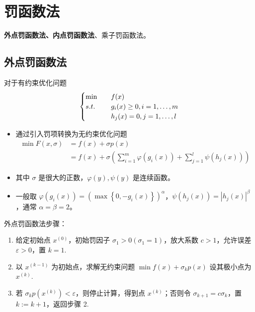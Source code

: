 \section{罚函数法}
\textbf{外点罚函数法、内点罚函数法}、乘子罚函数法。

\subsection{外点罚函数法}
\begin{note}
    对于有约束优化问题 
    \[
        \begin{cases}
            \min \quad &f(x)\\
            s.t. \quad &g_i(x) \ge 0, i = 1, \dots, m\\
            &h_j(x) = 0, j = 1, \dots, l
        \end{cases}
    \]
    \begin{itemize}
        \item 通过引入罚项转换为无约束优化问题 
        \begin{align*}
            \min F(x, \sigma) &= f(x) + \sigma p(x)\\
            &= f(x) + \sigma \left(\sum_{i = 1}^m \varphi(g_i(x)) + \sum_{j = 1}^l \psi(h_j(x))\right)
        \end{align*}
        \item 其中 $\sigma$ 是很大的正数，$\varphi(y), \psi(y)$ 是连续函数。
        \item 一般取 $\varphi(g_i(x)) = \left(\max\left\{0, -g_i(x)\right\}\right)^\alpha$，$\psi(h_j(x)) = |h_j(x)|^\beta$，通常 $\alpha = \beta = 2$。
    \end{itemize}
\end{note}

\begin{note}
    外点罚函数法步骤：\begin{enumerate}
        \item 给定初始点 $x^{(0)}$，初始罚因子 $\sigma_1 > 0(\sigma_1 = 1)$，放大系数 $c > 1$，允许误差 $\varepsilon > 0$，置 $k = 1$.
        \item 以 $x^{(k - 1)}$ 为初始点，求解无约束问题 $\min f(x) + \sigma_k p(x)$ 设其极小点为 $x^{(k)}$.
        \item 若 $\sigma_kp(x^{(k)}) < \varepsilon$，则停止计算，得到点 $x^{(k)}$；否则令 $\sigma_{k + 1} = c\sigma_k$，置 $k := k + 1$，返回步骤 2.
    \end{enumerate}
\end{note}

